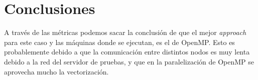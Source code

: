 \part{Conclusiones}

A través de las métricas podemos sacar la conclusión de que el mejor \textit{approach} para este caso y las máquinas donde se ejecutan, es el de OpenMP. Esto es probablemente debido a que la comunicación entre distintos nodos es muy lenta debido a la red del servidor de pruebas, y que en la paralelización de OpenMP se aprovecha mucho la vectorización.
